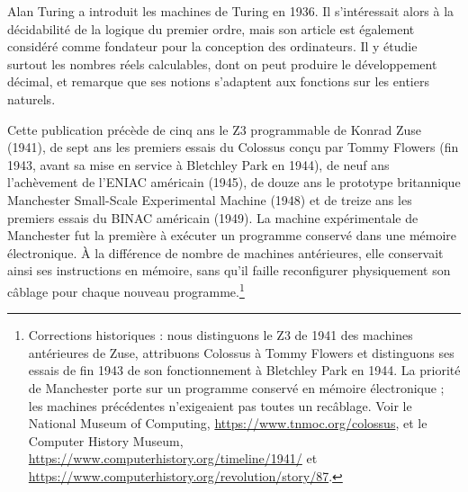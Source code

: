 \documentclass[../../../include/open-logic-section]{subfiles}
\begin{document}
\begin{history}
Alan Turing a introduit les machines de Turing en
1936. Il s'intéressait alors à la décidabilité de
la logique du premier ordre, mais son article est
également considéré comme fondateur pour la
conception des ordinateurs. Il y étudie surtout
les nombres réels calculables, dont on peut
produire le développement décimal, et remarque
que ses notions s'adaptent aux fonctions sur
les entiers naturels.

Cette publication précède de cinq ans le Z3
programmable de Konrad Zuse (1941), de sept ans
les premiers essais du Colossus conçu par Tommy
Flowers (fin 1943, avant sa mise en service à
Bletchley Park en 1944), de neuf ans l'achèvement
de l'ENIAC américain (1945), de douze ans le
prototype britannique Manchester Small-Scale
Experimental Machine (1948) et de treize ans les
premiers essais du BINAC américain (1949).
La machine expérimentale de Manchester fut la
première à exécuter un programme conservé dans
une mémoire électronique. À la différence de
nombre de machines antérieures, elle conservait
ainsi ses instructions en mémoire, sans qu'il
faille reconfigurer physiquement son câblage
pour chaque nouveau programme.\footnote{Corrections historiques : nous distinguons le Z3 de 1941 des machines antérieures de Zuse, attribuons Colossus à Tommy Flowers et distinguons ses essais de fin 1943 de son fonctionnement à Bletchley Park en 1944. La priorité de Manchester porte sur un programme conservé en mémoire électronique ; les machines précédentes n'exigeaient pas toutes un recâblage. Voir le National Museum of Computing, \url{https://www.tnmoc.org/colossus}, et le Computer History Museum, \url{https://www.computerhistory.org/timeline/1941/} et \url{https://www.computerhistory.org/revolution/story/87}.}
\end{history}
\end{document}
